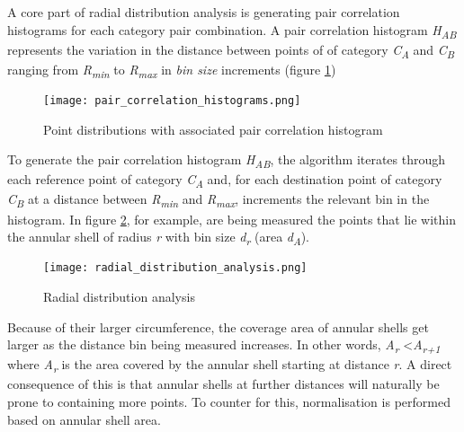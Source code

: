 A core part of radial distribution analysis is generating pair correlation histograms for each category pair combination. A pair correlation histogram \textit{H\textsubscript{AB}} represents the variation in the distance between points of of category \textit{C\textsubscript{A}} and \textit{C\textsubscript{B}} ranging from \textit{R\textsubscript{min}} to \textit{R\textsubscript{max}} in \textit{bin size} increments (figure \ref{Pair Correlation Histograms}) \\

\begin{figure}[h]
  \centering
	\label{Pair Correlation Histograms}
	\texttt{[image: pair\_correlation\_histograms.png]}
	\caption{Point distributions with associated pair correlation histogram \cite{Emilien2014}}
\end{figure}

To generate the pair correlation histogram \textit{H\textsubscript{AB}}, the algorithm iterates through each reference point of category \textit{C\textsubscript{A}} and, for each destination point of category \textit{C\textsubscript{B}} at a distance between \textit{R\textsubscript{min}} and \textit{R\textsubscript{max}}, increments the relevant bin in the histogram. In figure \ref{Radial distribution analysis}, for example, are being measured the points that lie within the annular shell of radius \textit{r} with bin size \textit{d\textsubscript{r}} (area \textit{d\textsubscript{A}}). 

\begin{figure}[h]
  \centering
	\label{Radial distribution analysis}
	\texttt{[image: radial\_distribution\_analysis.png]}
	\caption{Radial distribution analysis}
\end{figure}

Because of their larger circumference, the coverage area of annular shells get larger as the distance bin being measured increases. In other words, \textit{A\textsubscript{r}} \textless \textit{A\textsubscript{r+1}} where \textit{A\textsubscript{r}} is the area covered by the annular shell starting at distance \textit{r}. A direct consequence of this is that annular shells at further distances will naturally be prone to containing more points. To counter for this, normalisation is performed based on annular shell area. \\

